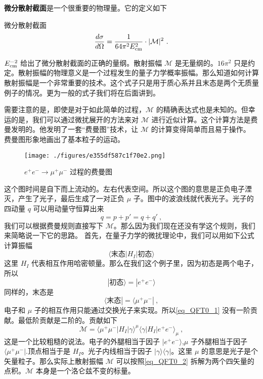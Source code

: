 \textbf{微分散射截面}是一个很重要的物理量。它的定义如下
\begin{definition}{微分散射截面}
\begin{equation}\label{eq_QFT0_3}
\frac{d\sigma}{d\Omega} = \frac{1}{64\pi^2E_{\rm cm}^2}\cdot |\mathcal M|^2~.
\end{equation}
\end{definition}
$E_{\rm cm}^{-2}$ 给出了微分散射截面的正确的量纲。散射振幅 $\mathcal M$ 是无量纲的。$16\pi^2$ 只是约定。散射振幅的物理意义是一个过程发生的量子力学概率振幅。那么知道如何计算散射振幅是一个非常重要的技术。这个式子只是用于质心系并且末态是两个无质量例子的情况。更为一般的式子我们将在后面讲到。

需要注意的是，即使是对于如此简单的过程，$\mathcal M$ 的精确表达式也是未知的。但幸运的是，我们可以通过微扰展开的方法来对 $\mathcal M$ 进行近似计算。这个计算方法是费曼发明的。他发明了一套“费曼图”技术，让 $\mathcal M$ 的计算变得简单而且易于操作。
费曼图形象地画出了基本粒子的运动。

\begin{figure}[ht]
\centering
\texttt{[image: ./figures/e355df587c1f70e2.png]}
\caption{$e^+e^-\rightarrow\mu^+\mu^-$ 过程的费曼图} \label{fig_QFT0_2}
\end{figure}

这个图时间是自下而上流动的。左右代表空间。所以这个图的意思是正负电子湮灭，产生了光子，最后生成了一对正负 $\mu$ 子。图中的波浪线就代表光子。光子的四动量 $q$ 可以用动量守恒算出来
\begin{equation}
q=p+p'=q+q'~,
\end{equation}
我们可以根据费曼规则直接写下 $\mathcal M$。那么因为我们现在还没有学这个规则，我们来简略说一下它的思路。 首先，在量子力学的微扰理论中，我们可以用如下公式计算振幅
\begin{equation} \label{eq_QFT0_1}
\langle \text{末态} |H_I| \text{初态} \rangle
\end{equation}
这里 $H_I$ 代表相互作用哈密顿量。那么在我们这个例子里，因为初态是两个电子，所以
\begin{equation}
| \text{初态} \rangle = | e^+ e^- \rangle
\end{equation}
同样的，末态是
\begin{equation}
\langle \text{末态} | = \langle \mu^+ \mu^- |~,
\end{equation}
电子和 $\mu$ 子的相互作用只能通过交换光子来实现。所以\autoref{eq_QFT0_1} 没有一阶贡献。最低阶贡献是二阶的。贡献如下
\begin{equation}\label{eq_QFT0_2}
\mathcal M = \langle \mu^+ \mu^- | H_I | \gamma \rangle^\mu \langle \gamma | H_I | e^+ e^- \rangle_\mu ~,
\end{equation}
这是一个比较粗糙的说法。电子的外腿相当于因子 $| e^+ e^- \rangle $,$\mu$ 子外腿相当于因子 $\langle \mu^+ \mu^- |$.顶点相当于是 $H_I$。光子内线相当于因子 $|\gamma\rangle\langle\gamma|$。这里 $\mu$ 的意思是光子是个矢量粒子。那么实际上散射振幅 $\mathcal M$ 可以按照\autoref{eq_QFT0_2} 拆解为两个四矢量的点积。$\mathcal M$ 本身是一个洛仑兹不变的标量。


